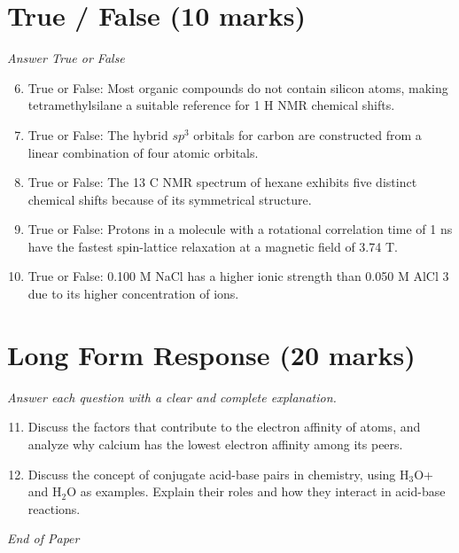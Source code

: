 \documentclass[12pt]{article}
\begin{document}
\section*{True / False (10 marks)}
\textit{Answer True or False}
\begin{enumerate}[label=\arabic*.]
\setcounter{enumi}{5}
\item True or False: Most organic compounds do not contain silicon atoms, making tetramethylsilane a suitable reference for 1 H NMR chemical shifts.
\item True or False: The hybrid $sp^3$ orbitals for carbon are constructed from a linear combination of four atomic orbitals.
\item True or False: The 13 C NMR spectrum of hexane exhibits five distinct chemical shifts because of its symmetrical structure.
\item True or False: Protons in a molecule with a rotational correlation time of 1 ns have the fastest spin-lattice relaxation at a magnetic field of 3.74 T.
\item True or False: 0.100 M NaCl has a higher ionic strength than 0.050 M AlCl 3 due to its higher concentration of ions.
\end{enumerate}

\section*{Long Form Response (20 marks)}
\textit{Answer each question with a clear and complete explanation.}
\begin{enumerate}[label=\arabic*.]
\setcounter{enumi}{10}
\item Discuss the factors that contribute to the electron affinity of atoms, and analyze why calcium has the lowest electron affinity among its peers.
\item Discuss the concept of conjugate acid-base pairs in chemistry, using H$_{3}$O+ and H$_{2}$O as examples. Explain their roles and how they interact in acid-base reactions.
\end{enumerate}

\vfill
\noindent\textit{End of Paper}
\end{document}
